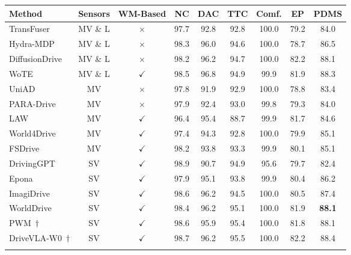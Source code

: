 \begin{table}[t] 
        \centering
        
        \setlength{\tabcolsep}{8pt}
        \begin{tabular}{l|c|c|cc|cccc}
        \toprule[1.5pt]
        Method & Sensors & WM-Based & NC & DAC & TTC & Comf. & EP & PDMS \\
        \midrule
        TransFuser~\cite{transfuser} & MV \& L & $\times$ & 97.7 & 92.8 & 92.8 & 100.0 & 79.2 & 84.0 \\
        Hydra-MDP~\cite{hydra} & MV \& L & $\times$ & 98.3 & 96.0 & 94.6 & 100.0 & 78.7 & 86.5 \\
        DiffusionDrive~\cite{diffusiondrive} & MV \& L & $\times$ & 98.2 & 96.2 & 94.7 & 100.0 & 82.2 & 88.1 \\
        WoTE~\cite{li2025wote} & MV \& L & $\checkmark$ & 98.5 & 96.8 & 94.9 & 99.9 & 81.9 & 88.3 \\
        \midrule
        UniAD~\cite{uniad} & MV & $\times$ & 97.8 & 91.9 & 92.9 & 100.0 & 78.8 & 83.4 \\
        PARA-Drive~\cite{paradrive} & MV & $\times$ & 97.9 & 92.4 & 93.0 & 99.8 & 79.3 & 84.0 \\
        LAW~\cite{law} & MV & $\checkmark$ & 96.4 & 95.4 & 88.7 & 99.9 & 81.7 & 84.6 \\
        World4Drive~\cite{world4drive} & MV & $\checkmark$& 97.4 & 94.3 & 92.8 & 100.0 & 79.9 & 85.1 \\
        FSDrive~\cite{zeng2025fsdrive} & MV & $\checkmark$& 98.2 & 93.8 & 93.3 & 99.9 & 80.1 & 85.1 \\
        DrivingGPT~\cite{drivinggpt} & SV & $\checkmark$ & 98.9 & 90.7 & 94.9 & 95.6 & 79.7 & 82.4 \\
        Epona~\cite{epona} & SV & $\checkmark$ & 97.9 & 95.1 & 93.8 & 99.9 & 80.4 & 86.2 \\
        ImagiDrive~\cite{li2025imagidrive} & SV & $\checkmark$ & 98.6 & 96.2 & 94.5 & 100.0 & 80.5 & 87.4 \\
        \rowcolor{gray!20}
        WorldDrive & SV & $\checkmark$ & 98.4 & 96.2 & 95.1  & 100.0 & 81.9 & \textbf{88.1} \\
        \midrule
        PWM~\cite{zhao2025pwm}$\dagger$ & SV & $\checkmark$ & 98.6 & 95.9 & 95.4 & 100.0 & 81.8 & 88.1 \\
        DriveVLA-W0~\cite{drivevlaw0}$\dagger$ & SV & $\checkmark$ & 98.7 & 96.2 & 95.5 & 100.0 & 82.2 & 88.4 \\
        \rowcolor{gray!20}

\end{tabular}
\end{table}
